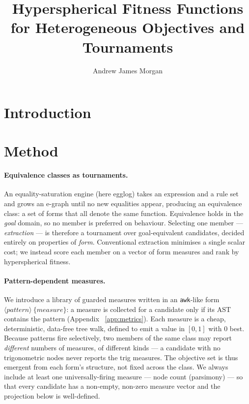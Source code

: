 \documentclass[sigconf]{acmart}
\begin{document}
\title{Hyperspherical Fitness Functions for Heterogeneous Objectives and Tournaments}

\author{Andrew James Morgan}
\renewcommand{\shortauthors}{Morgan}

\maketitle

\section{Introduction}
\label{sec:intro}

\section{Method}
\label{sec:method}

\paragraph{Equivalence classes as tournaments.} An equality-saturation engine
(here egglog) takes an expression and a rule set and grows an e-graph until no
new equalities appear, producing an equivalence class: a set of forms that all
denote the same function. Equivalence holds in the \emph{goal} domain, so no
member is preferred on behaviour. Selecting one member --- \emph{extraction} ---
is therefore a tournament over goal-equivalent candidates, decided entirely on
properties of \emph{form}. Conventional extraction minimises a single scalar
cost; we instead score each member on a vector of form measures and rank by
hyperspherical fitness.

\paragraph{Pattern-dependent measures.} We introduce a library of guarded
measures written in an \texttt{awk}-like form
$\langle\textit{pattern}\rangle\ \{\textit{measure}\}$: a measure is collected
for a candidate only if its AST contains the pattern (Appendix~%
\ref{app:metrics}). Each measure is a cheap, deterministic, data-free tree walk,
defined to emit a value in $[0,1]$ with $0$ best. Because patterns fire
selectively, two members of the same class may report \emph{different} numbers
of measures, of different kinds --- a candidate with no trigonometric nodes
never reports the trig measures. The objective set is thus emergent from each
form's structure, not fixed across the class. We always include at least one
universally-firing measure --- node count (parsimony) --- so that every
candidate has a non-empty, non-zero measure vector and the projection below is
well-defined.
\end{document}
